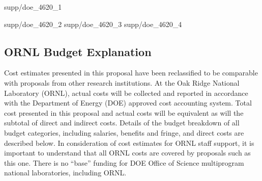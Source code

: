 
 {supp/doe_4620_1}
 {supp/doe_4620_2}
 {supp/doe_4620_3}
 {supp/doe_4620_4}

\subsection*{ORNL Budget Explanation}

Cost estimates presented in this proposal have been reclassified to be
comparable with proposals from other research institutions.  At the Oak Ridge
National Laboratory (ORNL), actual costs will be collected and reported in
accordance with the Department of Energy (DOE) approved cost accounting
system.  Total cost presented in this proposal and actual costs will be
equivalent as will the subtotal of direct and indirect costs.  Details of the
budget breakdown of all budget categories, including salaries, benefits and
fringe, and direct costs are described below.  In consideration of cost
estimates for ORNL staff support, it is important to understand that all ORNL
costs are covered by proposals such as this one.  There is no ``base'' funding
for DOE Office of Science multiprogram national laboratories, including ORNL.

